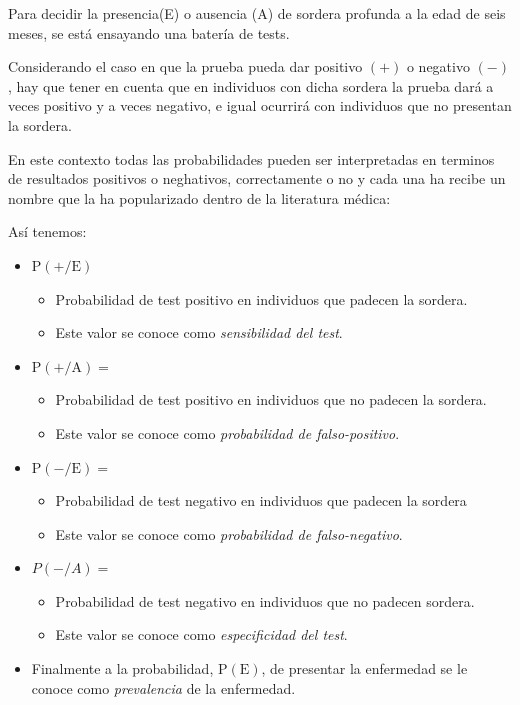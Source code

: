 \documentclass[
  a4paper,
  DIV=11,
  numbers=noendperiod]{scrreprt}
\providecommand{\tightlist}{%
  \setlength{\itemsep}{0pt}\setlength{\parskip}{0pt}}\usepackage{longtable,booktabs,array}
\begin{document}
Para decidir la presencia(E) o ausencia (A) de sordera profunda a la
edad de seis meses, se está ensayando una batería de tests.

Considerando el caso en que la prueba pueda dar positivo \((+)\) o
negativo \((-)\), hay que tener en cuenta que en individuos con dicha
sordera la prueba dará a veces positivo y a veces negativo, e igual
ocurrirá con individuos que no presentan la sordera.

En este contexto todas las probabilidades pueden ser interpretadas en
terminos de resultados positivos o neghativos, correctamente o no y cada
una ha recibe un nombre que la ha popularizado dentro de la literatura
médica:

Así tenemos:

\begin{itemize}
\item
  \(\mathrm{P}(+/ \mathrm{E})\)

  \begin{itemize}
  \tightlist
  \item
    Probabilidad de test positivo en individuos que padecen la sordera.
  \item
    Este valor se conoce como \emph{sensibilidad del test}.
  \end{itemize}
\item
  \(\mathrm{P}(+/ \mathrm{A})=\)

  \begin{itemize}
  \tightlist
  \item
    Probabilidad de test positivo en individuos que no padecen la
    sordera.
  \item
    Este valor se conoce como \emph{probabilidad de falso-positivo}.
  \end{itemize}
\item
  \(\mathrm{P}(-/ \mathrm{E})=\)

  \begin{itemize}
  \tightlist
  \item
    Probabilidad de test negativo en individuos que padecen la sordera
  \item
    Este valor se conoce como \emph{probabilidad de falso-negativo}.
  \end{itemize}
\item
  \(P(-/ A)=\)

  \begin{itemize}
  \tightlist
  \item
    Probabilidad de test negativo en individuos que no padecen sordera.
  \item
    Este valor se conoce como \emph{especificidad del test}.
  \end{itemize}
\item
  Finalmente a la probabilidad, \(\mathrm{P}(\mathrm{E})\), de presentar
  la enfermedad se le conoce como \emph{prevalencia} de la enfermedad.
\end{itemize}
\end{document}
